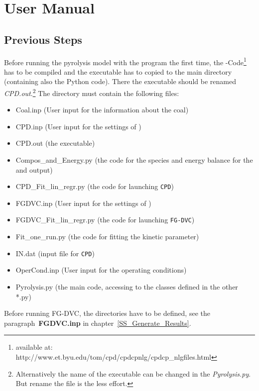 \section{User Manual}\label{S_Manual}
\subsection{Previous Steps}\label{SS_1stSteps}
Before running the \CPD pyrolysis model with the program the first time, the \CPD-Code\footnote{available at: http://www.et.byu.edu/\texttildelow tom/cpd/cpdcpnlg/cpdcp\_nlgfiles.html} has to be compiled and the executable has to copied to the main directory (containing also the Python code). There the \CPD executable should be renamed \emph{CPD.out}.\footnote{Alternatively the name of the executable can be changed in the \emph{Pyrolysis.py}. But rename the file is the less effort.}
The directory must contain the following files:
\begin{itemize}
 \item Coal.inp (User input for the information about the coal)
 \item CPD.inp (User input for the settings of \CPD)
 \item CPD.out (the \CPD executable)
 \item Compos\_and\_Energy.py (the code for the species and energy balance for the \CPD and \FGDVC output)
 \item CPD\_Fit\_lin\_regr.py (the code for launching \texttt{CPD})
 \item FGDVC.inp (User input for the settings of \FGDVC)
 \item FGDVC\_Fit\_lin\_regr.py (the code for launching \texttt{FG-DVC})
 \item Fit\_one\_run.py (the code for fitting the kinetic parameter)
 \item IN.dat (input file for \texttt{CPD})
 \item OperCond.inp (User input for the operating conditions)
 \item Pyrolysis.py (the main code, accessing to the classes defined in the other *.py)
\end{itemize}

Before running FG-DVC, the directories have to be defined, see the paragraph~\textbf{FGDVC.inp} in chapter~\ref{SS_Generate_Results}.
